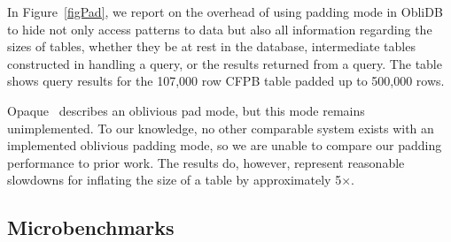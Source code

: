 \documentclass[letterpaper,twocolumn,10pt]{article}
\def\name/{ObliDB}
\begin{document}
In Figure~\ref{figPad}, we report on the overhead of using padding mode in \name/ to hide not only access patterns to data but also all information regarding the sizes of tables, whether they be at rest in the database, intermediate tables constructed in handling a query, or the results returned from a query. The table shows query results for the 107,000 row CFPB table padded up to 500,000 rows.

Opaque~\cite{ZDB+17} describes an oblivious pad mode, but this mode remains unimplemented. To our knowledge, no other comparable system exists with an implemented oblivious padding mode, so we are unable to compare our padding performance to prior work. The results do, however, represent reasonable slowdowns for inflating the size of a table by approximately 5$\times$.

\subsection{Microbenchmarks}
\end{document}
